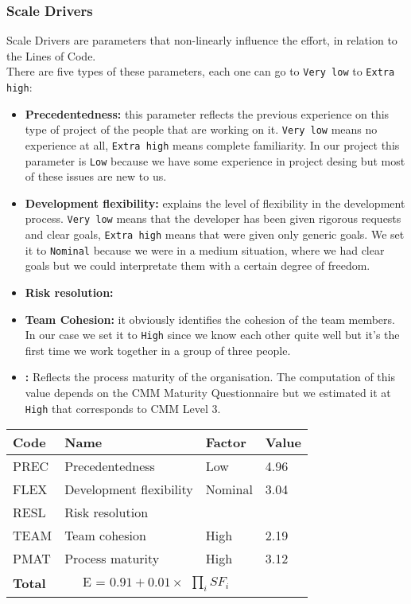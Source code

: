 \subsubsection{Scale Drivers}
Scale Drivers are parameters that non-linearly influence the effort, in relation to the Lines of Code.\\
There are five types of these parameters, each one can go to \texttt{Very low} to \texttt{Extra high}:\\
\begin{itemize}
\item{\textbf{Precedentedness:}} this parameter reflects the previous experience on this type of project of the people that are working on it. \texttt{Very low} means no experience at all, \texttt{Extra high} means complete familiarity.
	In our project this parameter is \texttt{Low} because we have some experience in project desing but most of these issues are new to us.\\
\item{\textbf{Development flexibility:}} explains the level of flexibility in the development process. \texttt{Very low} means that the developer has been given rigorous requests and clear goals, \texttt{Extra high} means that were given only generic goals.
	We set it to \texttt{Nominal} because we were in a medium \askpippo situation, where we had clear goals but we could interpretate them with a certain degree of freedom.\\
\item{\textbf{Risk resolution:}}
\item{\textbf{Team Cohesion:}} it obviously identifies the cohesion of the team members. In our case we set it to \texttt{High} since we know each other quite well but it's the first time we work together in a group of three people.\\
\item{\textbf{:}} Reflects the process maturity of the organisation. The computation of this value depends on the CMM Maturity Questionnaire but we estimated it at \texttt{High} that corresponds to CMM Level 3.\\
\end{itemize}




	\begin{tabular}{|l|l|l|l|}
	\hline
	\textbf{Code} & \textbf{Name} & \textbf{Factor} & \textbf{Value}\\
	\hline
	PREC & Precedentedness & Low & 4.96\\
	\hline
	FLEX & Development flexibility & Nominal & 3.04\\
	\hline
	RESL & Risk resolution &  & \\
	\hline
	TEAM & Team cohesion & High & 2.19\\
	\hline
	PMAT & Process maturity & High & 3.12\\
	\hline
	\textbf{Total} & \multicolumn{2}{|c|}{E = $ 0.91 + 0.01 \times \begin{matrix} \prod_{i} SF_i \end{matrix}$} & \\
	\hline	
	\end{tabular}
	
